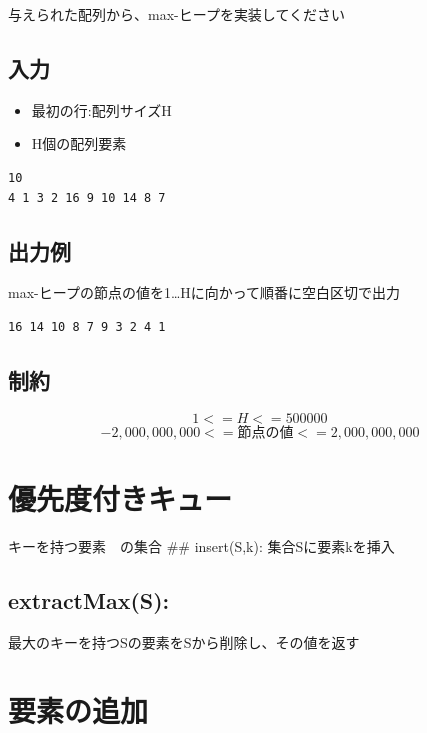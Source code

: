 \documentclass[a4paper,dvipdfmx]{jsarticle}
\providecommand{\tightlist}{%
      \setlength{\itemsep}{0pt}\setlength{\parskip}{0pt}}
\begin{document}
与えられた配列から、max-ヒープを実装してください

\subsection{入力}\label{ux5165ux529b}

\begin{itemize}
\tightlist
\item
  最初の行:配列サイズH
\item
  H個の配列要素
\end{itemize}

\begin{verbatim}
10
4 1 3 2 16 9 10 14 8 7 
\end{verbatim}

\subsection{出力例}\label{ux51faux529bux4f8b}

max-ヒープの節点の値を1\ldots{}Hに向かって順番に空白区切で出力

\begin{verbatim}
16 14 10 8 7 9 3 2 4 1
\end{verbatim}

\subsection{制約}\label{ux5236ux7d04}

\[ 1 <= H <= 500000\] \[ -2,000,000,000 <= 節点の値 <= 2,000,000,000 \]




    \section{優先度付きキュー}\label{ux512aux5148ux5ea6ux4ed8ux304dux30adux30e5ux30fc}

キーを持つ要素　の集合 \#\# insert(S,k): 集合Sに要素kを挿入

\subsection{extractMax(S):}\label{extractmaxs}

最大のキーを持つSの要素をSから削除し、その値を返す

    \section{要素の追加}\label{ux8981ux7d20ux306eux8ffdux52a0}
\end{document}
